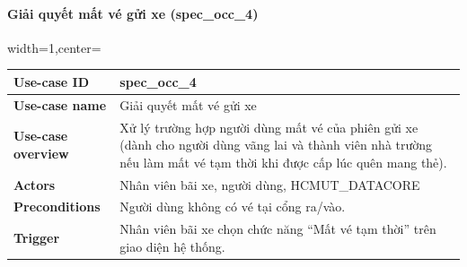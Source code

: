\paragraph{ Giải quyết mất vé gửi xe (spec\_occ\_4)}
\begin{adjustbox}{width=1\textwidth,center=\textwidth}
\small
\begin{tabular}{|>{\centering\arraybackslash}m{3.5cm}|m{13.2cm}|}
\hline
\textbf{Use-case ID} & spec\_occ\_4   \\ \hline
\textbf{Use-case name} & Giải quyết mất vé gửi xe   \\ \hline
\textbf{Use-case overview} & Xử lý trường hợp người dùng mất vé của phiên gửi xe (dành cho người dùng vãng lai và thành viên nhà trường nếu làm mất vé tạm thời khi được cấp lúc quên mang thẻ). \\ \hline
\textbf{Actors} & Nhân viên bãi xe, người dùng, HCMUT\_DATACORE   \\ \hline
\textbf{Preconditions} & Người dùng không có vé tại cổng ra/vào. \\ \hline
\textbf{Trigger} & Nhân viên bãi xe chọn chức năng “Mất vé tạm thời” trên giao diện hệ thống. \\ \hline


\end{tabular}
\end{adjustbox}
